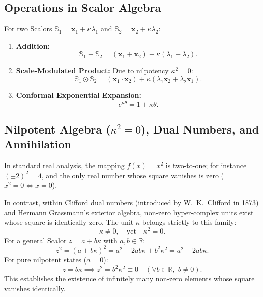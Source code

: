 \documentclass[11pt,a4paper]{article}
\begin{document}
\subsection{Operations in Scalor Algebra}
For two Scalors $\mathbb{S}_1 = \mathbf{x}_1 + \kappa \lambda_1$ and $\mathbb{S}_2 = \mathbf{x}_2 + \kappa \lambda_2$:
\begin{enumerate}
    \item \textbf{Addition:}
          \begin{equation}
              \mathbb{S}_1 + \mathbb{S}_2 = (\mathbf{x}_1 + \mathbf{x}_2) + \kappa (\lambda_1 + \lambda_2).
          \end{equation}
    \item \textbf{Scale-Modulated Product:}
          Due to nilpotency $\kappa^2 = 0$:
          \begin{equation}
              \mathbb{S}_1 \odot \mathbb{S}_2 = (\mathbf{x}_1 \cdot \mathbf{x}_2) + \kappa (\lambda_1 \mathbf{x}_2 + \lambda_2 \mathbf{x}_1).
          \end{equation}
    \item \textbf{Conformal Exponential Expansion:}
          \begin{equation}
              e^{\kappa \theta} = 1 + \kappa \theta.
              \label{eq:kappa_ustel}
          \end{equation}
\end{enumerate}

\subsection{Nilpotent Algebra ($\kappa^2 = 0$), Dual Numbers, and Annihilation}
\label{sec:nilpotent_annihilation}

In standard real analysis, the mapping $f(x) = x^2$ is two-to-one; for instance $(\pm 2)^2 = 4$, and the only real number whose square vanishes is zero ($x^2 = 0 \iff x = 0$).

In contrast, within Clifford dual numbers (introduced by W.~K.~Clifford in 1873) and Hermann Grassmann's exterior algebra, non-zero hyper-complex units exist whose square is identically zero. The unit $\kappa$ belongs strictly to this family:
\begin{equation}
    \kappa \neq 0, \quad \text{yet} \quad \kappa^2 = 0.
\end{equation}
For a general Scalor $z = a + b\kappa$ with $a, b \in \mathbb{R}$:
\begin{equation}
    z^2 = (a + b\kappa)^2 = a^2 + 2ab\kappa + b^2 \kappa^2 = a^2 + 2ab\kappa.
\end{equation}
For pure nilpotent states ($a = 0$):
\begin{equation}
    z = b\kappa \implies z^2 = b^2 \kappa^2 \equiv 0 \quad (\forall b \in \mathbb{R}, \; b \neq 0).
\end{equation}
This establishes the existence of infinitely many non-zero elements whose square vanishes identically.
\end{document}
